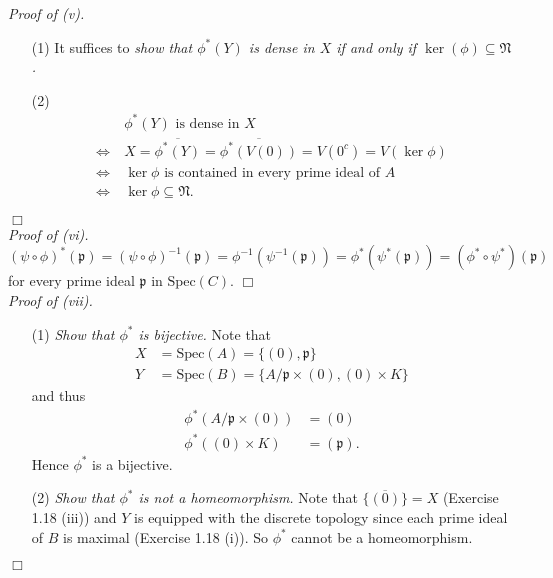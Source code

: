 \documentclass{article}
\begin{document}
\emph{Proof of (v).}
\begin{enumerate}
\item[(1)]
  It suffices to \emph{show that
  $\phi^{*}(Y)$ is dense in $X$ if and only if $\ker(\phi) \subseteq \mathfrak{N}$.}

\item[(2)]
  \begin{align*}
    & \:
    \text{$\phi^{*}(Y)$ is dense in $X$} \\
    \Longleftrightarrow & \:
    X = \overline{\phi^{*}(Y)} = \overline{\phi^{*}(V(0))} = V(0^c) = V(\ker\phi) \\
    \Longleftrightarrow & \:
    \text{$\ker\phi$ is contained in every prime ideal of $A$} \\
    \Longleftrightarrow & \:
    \ker\phi \subseteq \mathfrak{N}.
  \end{align*}
\end{enumerate}
$\Box$ \\



\emph{Proof of (vi).}
  \[
    (\psi \circ \phi)^{*}(\mathfrak{p})
    = (\psi \circ \phi)^{-1}(\mathfrak{p})
    = \phi^{-1}(\psi^{-1}(\mathfrak{p}))
    = \phi^{*}(\psi^{*}(\mathfrak{p}))
    = (\phi^{*} \circ \psi^{*})(\mathfrak{p})
  \]
  for every prime ideal $\mathfrak{p}$ in $\mathrm{Spec}(C)$.
$\Box$ \\



\emph{Proof of (vii).}
\begin{enumerate}
\item[(1)]
  \emph{Show that $\phi^{*}$ is bijective.}
  Note that
  \begin{align*}
    X &= \mathrm{Spec}(A) = \{ (0), \mathfrak{p} \} \\
    Y &= \mathrm{Spec}(B) = \{ A/\mathfrak{p} \times (0), (0) \times K \}
  \end{align*}
  and thus
  \begin{align*}
    \phi^{*}(A/\mathfrak{p} \times (0)) &= (0) \\
    \phi^{*}((0) \times K) &= (\mathfrak{p}).
  \end{align*}
  Hence $\phi^{*}$ is a bijective.

\item[(2)]
  \emph{Show that $\phi^{*}$ is not a homeomorphism.}
  Note that $\overline{\{(0)\}} = X$ (Exercise 1.18 (iii))
  and $Y$ is equipped with the discrete topology since
  each prime ideal of $B$ is maximal (Exercise 1.18 (i)).
  So $\phi^{*}$ cannot be a homeomorphism.
\end{enumerate}
$\Box$ \\\\
\end{document}
